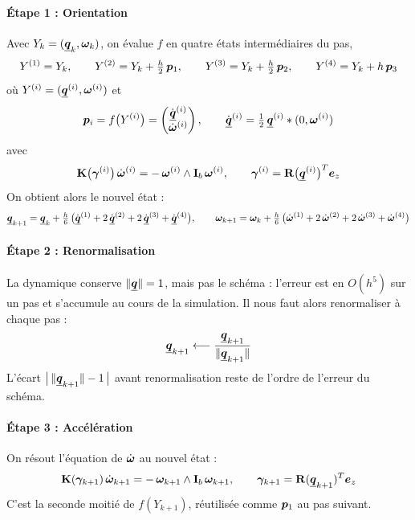 \paragraph{Étape 1 : Orientation} Avec
$Y_k = (\underline{\bm{q}}_k,\bm{\omega}_k)$, on évalue $f$ en quatre états
intermédiaires du pas,
\[
    Y^{(1)} = Y_k,
    \qquad
    Y^{(2)} = Y_k + \tfrac{h}{2}\,\bm{p}_1,
    \qquad
    Y^{(3)} = Y_k + \tfrac{h}{2}\,\bm{p}_2,
    \qquad
    Y^{(4)} = Y_k + h\,\bm{p}_3
\]
où $Y^{(i)} = (\underline{\bm{q}}^{(i)},\bm{\omega}^{(i)})$ et
\[
    \bm{p}_i = f\bigl(Y^{(i)}\bigr)
    = \begin{pmatrix}
        \dot{\underline{\bm{q}}}^{(i)}\\ \dot{\bm{\omega}}^{(i)}
    \end{pmatrix},
    \qquad
    \dot{\underline{\bm{q}}}^{(i)} = \tfrac12\,\underline{\bm{q}}^{(i)}\ast
    (0,\bm{\omega}^{(i)})
\]
avec
\[
    \mathbf{K}\bigl(\bm{\gamma}^{(i)}\bigr)\,\dot{\bm{\omega}}^{(i)}
    = -\,\bm{\omega}^{(i)}\wedge\mathbf{I}_b\,\bm{\omega}^{(i)},
    \qquad
    \bm{\gamma}^{(i)} = \mathbf{R}\bigl(\underline{\bm{q}}^{(i)}\bigr)^T\bm{e}_z
\]
On obtient alors le nouvel état :
\[
    \underline{\bm{q}}_{k+1} = \underline{\bm{q}}_k + \tfrac{h}{6}\,\bigl(\dot{\underline{\bm{q}}}^{(1)}
    + 2\,\dot{\underline{\bm{q}}}^{(2)} + 2\,\dot{\underline{\bm{q}}}^{(3)}
    + \dot{\underline{\bm{q}}}^{(4)}\bigr),
    \qquad
    \bm{\omega}_{k+1} = \bm{\omega}_k + \tfrac{h}{6}\,\bigl(
    \dot{\bm{\omega}}^{(1)} + 2\,\dot{\bm{\omega}}^{(2)}
    + 2\,\dot{\bm{\omega}}^{(3)} + \dot{\bm{\omega}}^{(4)}\bigr)
\]

\paragraph{Étape 2 : Renormalisation} La dynamique conserve
$\|\underline{\bm{q}}\| = 1$, mais pas le schéma : l'erreur est en
$O(h^5)$ sur un pas et s'accumule au cours de la simulation. Il nous faut alors 
renormaliser à chaque pas : 
\[
    \underline{\bm{q}}_{k+1} \longleftarrow
    \frac{\underline{\bm{q}}_{k+1}}{\|\underline{\bm{q}}_{k+1}\|}
\]
L'écart $\bigl|\,\|\underline{\bm{q}}_{k+1}\| - 1\,\bigr|$ avant renormalisation
reste de l'ordre de l'erreur du schéma.

\paragraph{Étape 3 : Accélération} On résout l'équation de
$\dot{\bm{\omega}}$ au nouvel état :
\[
    \mathbf{K}(\bm{\gamma}_{k+1})\,\dot{\bm{\omega}}_{k+1}
    = -\,\bm{\omega}_{k+1}\wedge\mathbf{I}_b\,\bm{\omega}_{k+1},
    \qquad
    \bm{\gamma}_{k+1} = \mathbf{R}(\underline{\bm{q}}_{k+1})^T\bm{e}_z
\]
C'est la seconde moitié de $f(Y_{k+1})$, réutilisée comme
$\bm{p}_1$ au pas suivant.

